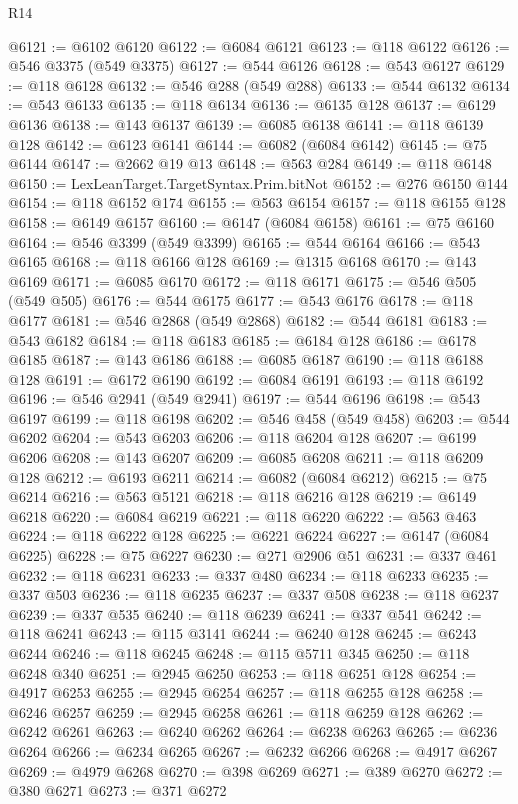 \begin{lexlean}{R14}
\begin{coremodule}
@6121 := @6102 @6120
@6122 := @6084 @6121
@6123 := @118 @6122
@6126 := @546 @3375 (@549 @3375)
@6127 := @544 @6126
@6128 := @543 @6127
@6129 := @118 @6128
@6132 := @546 @288 (@549 @288)
@6133 := @544 @6132
@6134 := @543 @6133
@6135 := @118 @6134
@6136 := @6135 @128
@6137 := @6129 @6136
@6138 := @143 @6137
@6139 := @6085 @6138
@6141 := @118 @6139 @128
@6142 := @6123 @6141
@6144 := @6082 (@6084 @6142)
@6145 := @75 @6144
@6147 := @2662 @19 @13
@6148 := @563 @284
@6149 := @118 @6148
@6150 := LexLeanTarget.TargetSyntax.Prim.bitNot
@6152 := @276 @6150 @144
@6154 := @118 @6152 @174
@6155 := @563 @6154
@6157 := @118 @6155 @128
@6158 := @6149 @6157
@6160 := @6147 (@6084 @6158)
@6161 := @75 @6160
@6164 := @546 @3399 (@549 @3399)
@6165 := @544 @6164
@6166 := @543 @6165
@6168 := @118 @6166 @128
@6169 := @1315 @6168
@6170 := @143 @6169
@6171 := @6085 @6170
@6172 := @118 @6171
@6175 := @546 @505 (@549 @505)
@6176 := @544 @6175
@6177 := @543 @6176
@6178 := @118 @6177
@6181 := @546 @2868 (@549 @2868)
@6182 := @544 @6181
@6183 := @543 @6182
@6184 := @118 @6183
@6185 := @6184 @128
@6186 := @6178 @6185
@6187 := @143 @6186
@6188 := @6085 @6187
@6190 := @118 @6188 @128
@6191 := @6172 @6190
@6192 := @6084 @6191
@6193 := @118 @6192
@6196 := @546 @2941 (@549 @2941)
@6197 := @544 @6196
@6198 := @543 @6197
@6199 := @118 @6198
@6202 := @546 @458 (@549 @458)
@6203 := @544 @6202
@6204 := @543 @6203
@6206 := @118 @6204 @128
@6207 := @6199 @6206
@6208 := @143 @6207
@6209 := @6085 @6208
@6211 := @118 @6209 @128
@6212 := @6193 @6211
@6214 := @6082 (@6084 @6212)
@6215 := @75 @6214
@6216 := @563 @5121
@6218 := @118 @6216 @128
@6219 := @6149 @6218
@6220 := @6084 @6219
@6221 := @118 @6220
@6222 := @563 @463
@6224 := @118 @6222 @128
@6225 := @6221 @6224
@6227 := @6147 (@6084 @6225)
@6228 := @75 @6227
@6230 := @271 @2906 @51
@6231 := @337 @461
@6232 := @118 @6231
@6233 := @337 @480
@6234 := @118 @6233
@6235 := @337 @503
@6236 := @118 @6235
@6237 := @337 @508
@6238 := @118 @6237
@6239 := @337 @535
@6240 := @118 @6239
@6241 := @337 @541
@6242 := @118 @6241
@6243 := @115 @3141
@6244 := @6240 @128
@6245 := @6243 @6244
@6246 := @118 @6245
@6248 := @115 @5711 @345
@6250 := @118 @6248 @340
@6251 := @2945 @6250
@6253 := @118 @6251 @128
@6254 := @4917 @6253
@6255 := @2945 @6254
@6257 := @118 @6255 @128
@6258 := @6246 @6257
@6259 := @2945 @6258
@6261 := @118 @6259 @128
@6262 := @6242 @6261
@6263 := @6240 @6262
@6264 := @6238 @6263
@6265 := @6236 @6264
@6266 := @6234 @6265
@6267 := @6232 @6266
@6268 := @4917 @6267
@6269 := @4979 @6268
@6270 := @398 @6269
@6271 := @389 @6270
@6272 := @380 @6271
@6273 := @371 @6272

\end{coremodule}
\end{lexlean}

